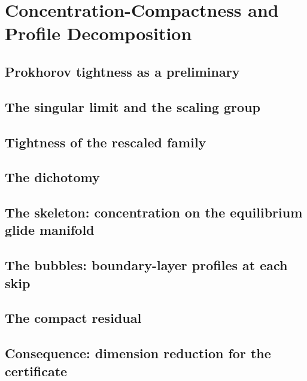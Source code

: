 
\section{Concentration-Compactness and Profile Decomposition}
\label{sec:concentration}

\subsection{Prokhorov tightness as a preliminary}
\label{sub:prokhorov_tightness}

\subsection{The singular limit and the scaling group}
\label{sub:singular_limit_and_scaling_group}

\subsection{Tightness of the rescaled family}
\label{sub:tightness_of_rescaled_family}

\subsection{The dichotomy}
\label{sub:the_dichotomy}

\subsection{The skeleton: concentration on the equilibrium glide manifold}
\label{sub:the_skeleton}

\subsection{The bubbles: boundary-layer profiles at each skip}
\label{sub:the_bubbles}

\subsection{The compact residual}
\label{sub:the_compact_residual}

\subsection{Consequence: dimension reduction for the certificate}
\label{sub:dimension_reduction}

